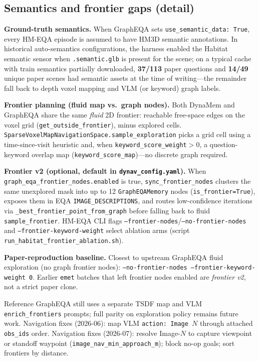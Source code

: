 \subsection{Semantics and frontier gaps (detail)}

\textbf{Ground-truth semantics.}
When GraphEQA sets \texttt{use\_semantic\_data: True}, every HM-EQA episode is assumed to have HM3D semantic annotations.
In historical auto-semantics configurations, the harness enabled the Habitat semantic sensor when \texttt{.semantic.glb} is present for the scene; on a typical cache with train semantics partially downloaded, \textbf{37/113} paper questions and \textbf{14/49} unique paper scenes had semantic assets at the time of writing---the remainder fall back to depth voxel mapping and VLM (or keyword) graph labels.

\textbf{Frontier planning (fluid map vs.\ graph nodes).}
Both DynaMem and GraphEQA share the same \emph{fluid} 2D frontier: reachable free-space edges on the voxel grid (\texttt{get\_outside\_frontier}), minus explored cells.
\texttt{SparseVoxelMapNavigationSpace.sample\_exploration} picks a grid cell using a time-since-visit heuristic and, when \texttt{keyword\_score\_weight}$>0$, a question-keyword overlap map (\texttt{keyword\_score\_map})---no discrete graph required.

\textbf{Frontier v2 (optional, default in \texttt{dynav\_config.yaml}).}
When \texttt{graph\_eqa\_frontier\_nodes.enabled} is true, \texttt{sync\_frontier\_nodes} clusters the same unexplored mask into up to 12 \texttt{GraphEQAMemory} nodes (\texttt{is\_frontier=True}), exposes them in EQA \texttt{IMAGE\_DESCRIPTIONS}, and routes low-confidence iterations via \texttt{\_best\_frontier\_point\_from\_graph} before falling back to fluid \texttt{sample\_frontier}.
HM-EQA CLI flags \texttt{--frontier-nodes}/\texttt{--no-frontier-nodes} and \texttt{--frontier-keyword-weight} select ablation arms (script \texttt{run\_habitat\_frontier\_ablation.sh}).

\textbf{Paper-reproduction baseline.}
Closest to upstream GraphEQA fluid exploration (no graph frontier nodes): \texttt{--no-frontier-nodes --frontier-keyword-weight 0}.
Earlier \texttt{emet} batches that left frontier nodes enabled are \emph{frontier v2}, not a strict paper clone.

Reference GraphEQA still uses a separate TSDF map and VLM \texttt{enrich\_frontiers} prompts; full parity on exploration policy remains future work.
Navigation fixes (2026-06): map VLM \texttt{action: Image $N$} through attached \texttt{obs\_ids} order.
Navigation fixes (2026-07): resolve Image-$N$ to capture viewpoint or standoff waypoint (\texttt{image\_nav\_min\_approach\_m}); block no-op goals; sort frontiers by distance.

